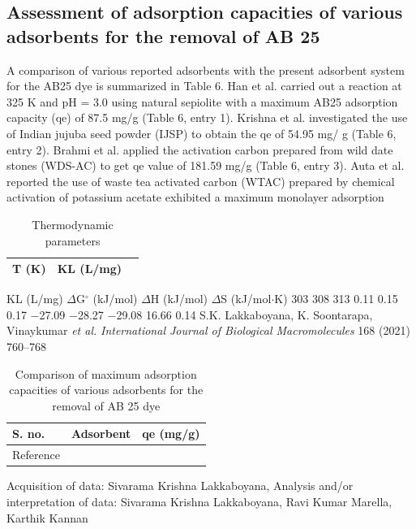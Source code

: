 \documentclass[final,5p,times,twocolumn,authoryear]{elsarticle}
\begin{document}
\subsection{Assessment of adsorption capacities of various adsorbents for the removal of AB 25}
A comparison of various reported adsorbents with the present adsorbent system for the AB25 dye is summarized in Table 6. Han et al. carried out a reaction at 325 K and pH = 3.0 using natural sepiolite with a maximum AB25 adsorption capacity (qe) of 87.5 mg/g (Table 6, entry 1). Krishna et al. investigated the use of Indian jujuba seed powder (IJSP) to obtain the qe of 54.95 mg/ g (Table 6, entry 2). Brahmi et al. applied the activation carbon prepared from wild date stones (WDS-AC) to get qe value of 181.59 mg/g (Table 6, entry 3). Auta et al. reported the use of waste tea activated carbon (WTAC) prepared by chemical activation of potassium acetate exhibited a maximum monolayer adsorption 
\begin{table}[htbp]
\centering
\caption{Thermodynamic parameters}
\label{tab:5}
\begin{tabular}{lll}
\hline
T (K) & KL (L/mg) \\
\hline
\end{tabular}
\end{table}

KL (L/mg)
$\Delta$G$^{\circ}$ (kJ/mol)
$\Delta$H (kJ/mol)
$\Delta$S (kJ/mol$\cdot$K)
303 308 313
0.11 0.15 0.17
$-$27.09 $-$28.27 $-$29.08
16.66
0.14
S.K. Lakkaboyana, K. Soontarapa, Vinaykumar \textit{et al.}
\textit{International Journal of Biological Macromolecules} 168 (2021) 760--768
\begin{table}[htbp]
\centering
\caption{Comparison of maximum adsorption capacities of various adsorbents for the removal of AB 25 dye}
\label{tab:label}
\begin{tabular}{lll}
\hline
S. no. & Adsorbent & qe (mg/g) \\
\hline
Reference &
\end{tabular}
\end{table}
Acquisition of data: Sivarama Krishna Lakkaboyana, Analysis and/or interpretation of data: Sivarama Krishna Lakkaboyana, Ravi Kumar Marella, Karthik Kannan
\end{document}
